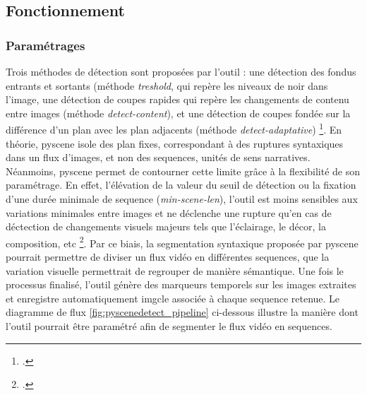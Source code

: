 \subsection{Fonctionnement}

\subsubsection{Paramétrages}
Trois méthodes de détection sont proposées par l’outil : une détection des fondus entrants et sortants (méthode \textit{treshold}, qui repère les niveaux de noir dans l’image, une détection de coupes rapides qui repère les changements de contenu entre images (méthode \textit{detect-content}), et une détection de coupes fondée sur la différence d’un plan avec les \gls{plan} adjacents (méthode \textit{detect-adaptative}) \footcite{zotero-item-708}. 
En théorie, \gls{pyscene} isole des \gls{plan} fixes, correspondant à des ruptures syntaxiques dans un flux d'images, et non des \gls{sequence}s, unités de sens narratives. Néanmoins, \gls{pyscene} permet de contourner cette limite grâce à la flexibilité de son paramétrage. 
En effet, l'élévation de la valeur du seuil de détection ou la fixation d'une durée minimale de \gls{sequence} (\textit{min-scene-len}), l'outil est moins sensibles aux variations minimales entre images et ne déclenche une rupture qu'en cas de déctection de changements visuels majeurs tels que l'éclairage, le décor, la composition, etc \footcite{zotero-item-708}. Par ce biais, la segmentation syntaxique proposée par \gls{pyscene} pourrait permettre de diviser un flux vidéo en différentes \gls{sequence}s, que la variation visuelle permettrait de regrouper de manière sémantique. Une fois le processus finalisé, l'outil génère des marqueurs temporels sur les images extraites et enregistre automatiquement \gls{imgcle} associée à chaque \gls{sequence} retenue. Le diagramme de flux \ref{fig:pyscenedetect_pipeline} ci-dessous illustre la manière dont l'outil pourrait être paramétré afin de segmenter le flux vidéo en \gls{sequence}s.

